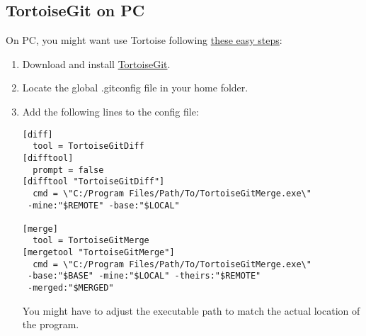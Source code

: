 \documentclass{report}
\begin{document}
\subsection{TortoiseGit on PC}
On PC, you might want use Tortoise following \href{https://gist.github.com/ellisda/25cdd92129c5b44406ab}{these easy steps}:
\begin{enumerate}[noitemsep]
  \item Download and install \href{https://tortoisegit.org/download}{TortoiseGit}.
  \item Locate the global .gitconfig file in your home folder.
  \item Add the following lines to the config file:
  \begin{verbatim}
[diff]
  tool = TortoiseGitDiff	
[difftool]
  prompt = false
[difftool "TortoiseGitDiff"]
  cmd = \"C:/Program Files/Path/To/TortoiseGitMerge.exe\"
 -mine:"$REMOTE" -base:"$LOCAL" 

[merge]
  tool = TortoiseGitMerge	
[mergetool "TortoiseGitMerge"]
  cmd = \"C:/Program Files/Path/To/TortoiseGitMerge.exe\"
 -base:"$BASE" -mine:"$LOCAL" -theirs:"$REMOTE" 
 -merged:"$MERGED"
  \end{verbatim}
  You might have to adjust the executable path to match the actual location of the program.
\end{enumerate}
\end{document}
